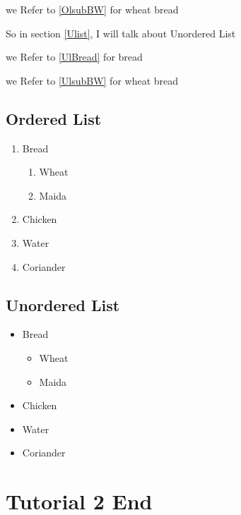 \documentclass{article}
\begin{document}
we Refer to \ref{OlsubBW} for wheat bread

So in section \ref{Ulist}, I will talk about Unordered List

we Refer to \ref{UlBread} for bread

we Refer to \ref{UlsubBW} for wheat bread

\subsection{Ordered List\label{Olist}}
\begin{enumerate}
  \item Bread\label{OlBread}
    \begin{enumerate}
      \item Wheat\label{OlsubBW}
      \item Maida
    \end{enumerate}
  \item Chicken
  \item Water
  \item Coriander 
\end{enumerate}

\subsection{Unordered List\label{Ulist}}
\begin{itemize} 
  \item Bread\label{UlBread}
    \begin{itemize}
      \item Wheat\label{UlsubBW}
      \item Maida
    \end{itemize}
  \item Chicken
  \item Water
  \item Coriander 
\end{itemize}

\section{Tutorial 2 End}
\end{document}
